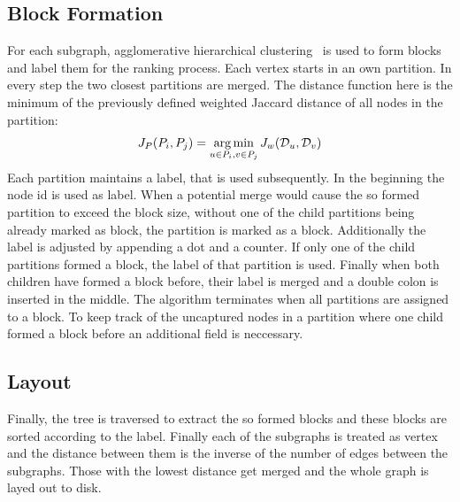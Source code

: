     \subsection{Block Formation}\label{\positionnumber}
    For each subgraph, agglomerative hierarchical clustering~\autocite{hac} is used to form blocks and label them for the ranking process.
    Each vertex starts in an own partition. 
    In every step the two closest partitions are merged. 
    The distance function here is the minimum of the previously defined weighted Jaccard distance of all nodes in the partition:
    \[ J_P (P_i, P_j) = \operatorname*{arg\,min}_{u \in P_i, v \in P_j} J_w (\mathcal{D}_u, \mathcal{D}_v) \]
    Each partition maintains a label, that is used subsequently.
    In the beginning the node id is used as label. 
    When a potential merge would cause the so formed partition to exceed the block size, without one of the child partitions being already marked as block, the partition is marked as a block.
    Additionally the label is adjusted by appending a dot and a counter.
    If only one of the child partitions formed a block, the label of that partition is used.
    Finally when both children have formed a block before, their label is merged and a double colon is inserted in the middle.
    The algorithm terminates when all partitions are assigned to a block.
    To keep track of the uncaptured nodes in a partition where one child formed a block before an additional field is neccessary.    
    
    
    \subsection{Layout}\label{\positionnumber}
    Finally, the tree is traversed to extract the so formed blocks and these blocks are sorted according to the label. 
    Finally each of the subgraphs is treated as vertex and the distance between them is the inverse of the number of edges between the subgraphs. Those with the lowest distance get merged and the whole graph is layed out to disk.
    

